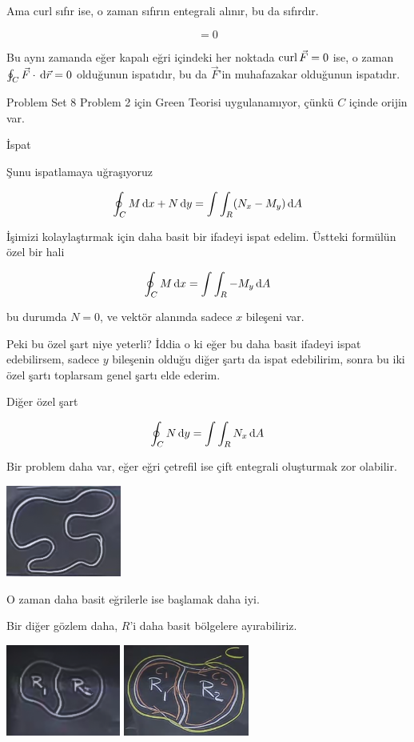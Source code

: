 \documentclass[12pt,fleqn]{article}\usepackage{../../common}
\begin{document}
Ama curl sıfır ise, o zaman sıfırın entegrali alınır, bu da sıfırdır. 

$$ = 0 $$

Bu aynı zamanda eğer kapalı eğri içindeki her noktada $\operatorname{curl} \vec{F} = 0$ ise,
o zaman $\oint_C \vec{F} \cdot \,\mathrm{d}\vec{r} = 0$ olduğunun ispatıdır, bu da
$\vec{F}$'in muhafazakar olduğunun ispatıdır.

Problem Set 8 Problem 2 için Green Teorisi uygulanamıyor, çünkü $C$
içinde orijin var. 

İspat

Şunu ispatlamaya uğraşıyoruz

$$ \oint_C M \,\mathrm{d} x + N \,\mathrm{d} y = \int \int_R (N_x - M_y) \,\mathrm{d} A $$

İşimizi kolaylaştırmak için daha basit bir ifadeyi ispat edelim. Üstteki
formülün özel bir hali

$$ \oint_C M \,\mathrm{d} x  = \int \int_R -M_y \,\mathrm{d} A $$

bu durumda $N=0$, ve vektör alanında sadece $x$ bileşeni var. 

Peki bu özel şart niye yeterli? İddia o ki eğer bu daha basit ifadeyi ispat
edebilirsem, sadece $y$ bileşenin olduğu diğer şartı da ispat edebilirim,
sonra bu iki özel şartı toplarsam genel şartı elde ederim. 

Diğer özel şart

$$ \oint_C N \,\mathrm{d} y  = \int \int_R N_x \,\mathrm{d} A $$

Bir problem daha var, eğer eğri çetrefil ise çift entegrali oluşturmak zor
olabilir. 

\begin{center}
\includegraphics[height=3cm]{22_3.png}
\end{center}

O zaman daha basit eğrilerle ise başlamak daha iyi. 

Bir diğer gözlem daha, $R$'i daha basit bölgelere ayırabiliriz. 

\begin{center}
\includegraphics[height=3cm]{22_4.png}
\includegraphics[height=3cm]{22_5.png}
\end{center}
\end{document}
